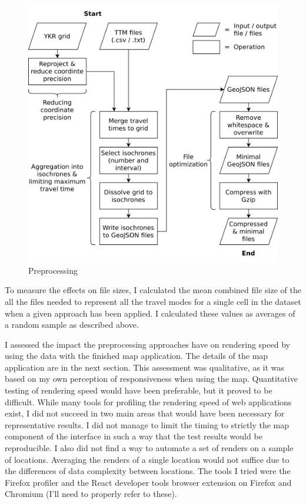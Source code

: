 \begin{figure}[H]
	\centering
	\includegraphics[width=\diagramwidth]{visual/figures/diagrams/preprocessing.png}
	\caption{Preprocessing}
	\label{fig:preprocessing}
\end{figure}

To measure the effects on file sizes,
I calculated the mean combined file size of the all the files needed to represent
all the travel modes for a single cell in the dataset
when a given approach has been applied.
I calculated these values as averages of a random sample as described above.

I assessed the impact the preprocessing approaches have on rendering speed
by using the data with the finished map application.
The details of the map application are in the next section.
This assessment was qualitative,
as it was based on my own perception of responsiveness when using the map.
Quantitative testing of rendering speed would have been preferable,
but it proved to be difficult.
While many tools for profiling the rendering speed of web applications exist,
I did not succeed in two main areas
that would have been necessary for representative results.
I did not manage to limit the timing to strictly the map
component of the interface in such a way that
the test results would be reproducible.
I also did not find a way to automate a set of renders
on a sample of locations.
Averaging the renders of a single location would not suffice
due to the differences of data complexity between locations.
The tools I tried were the Firefox profiler
and the React developer tools browser extension on Firefox and Chromium
(I'll need to properly refer to these).

